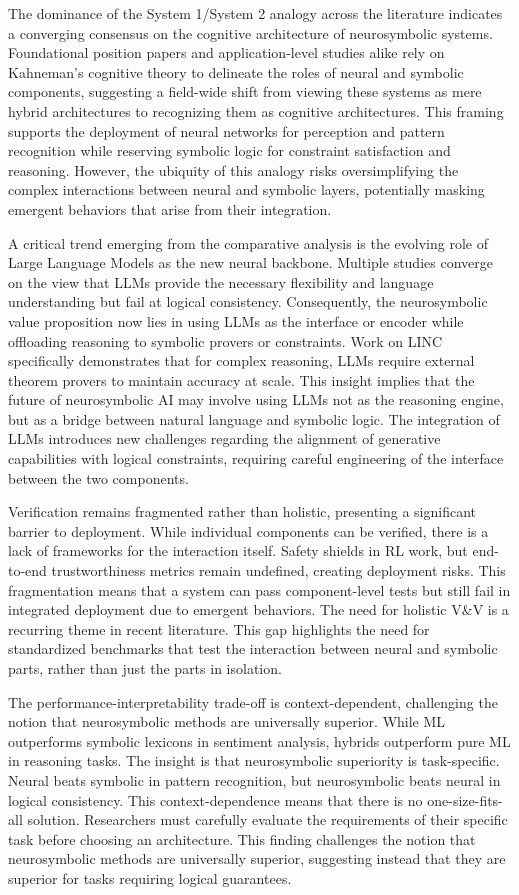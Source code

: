 \documentclass{article}
\begin{document}
The dominance of the System 1/System 2 analogy across the literature indicates a converging consensus on the cognitive architecture of neurosymbolic systems. Foundational position papers and application-level studies alike rely on Kahneman's cognitive theory to delineate the roles of neural and symbolic components, suggesting a field-wide shift from viewing these systems as mere hybrid architectures to recognizing them as cognitive architectures. This framing supports the deployment of neural networks for perception and pattern recognition while reserving symbolic logic for constraint satisfaction and reasoning. However, the ubiquity of this analogy risks oversimplifying the complex interactions between neural and symbolic layers, potentially masking emergent behaviors that arise from their integration.

A critical trend emerging from the comparative analysis is the evolving role of Large Language Models as the new neural backbone. Multiple studies converge on the view that LLMs provide the necessary flexibility and language understanding but fail at logical consistency. Consequently, the neurosymbolic value proposition now lies in using LLMs as the interface or encoder while offloading reasoning to symbolic provers or constraints. Work on LINC specifically demonstrates that for complex reasoning, LLMs require external theorem provers to maintain accuracy at scale. This insight implies that the future of neurosymbolic AI may involve using LLMs not as the reasoning engine, but as a bridge between natural language and symbolic logic. The integration of LLMs introduces new challenges regarding the alignment of generative capabilities with logical constraints, requiring careful engineering of the interface between the two components.

Verification remains fragmented rather than holistic, presenting a significant barrier to deployment. While individual components can be verified, there is a lack of frameworks for the interaction itself. Safety shields in RL work, but end-to-end trustworthiness metrics remain undefined, creating deployment risks. This fragmentation means that a system can pass component-level tests but still fail in integrated deployment due to emergent behaviors. The need for holistic V\&V is a recurring theme in recent literature. This gap highlights the need for standardized benchmarks that test the interaction between neural and symbolic parts, rather than just the parts in isolation.

The performance-interpretability trade-off is context-dependent, challenging the notion that neurosymbolic methods are universally superior. While ML outperforms symbolic lexicons in sentiment analysis, hybrids outperform pure ML in reasoning tasks. The insight is that neurosymbolic superiority is task-specific. Neural beats symbolic in pattern recognition, but neurosymbolic beats neural in logical consistency. This context-dependence means that there is no one-size-fits-all solution. Researchers must carefully evaluate the requirements of their specific task before choosing an architecture. This finding challenges the notion that neurosymbolic methods are universally superior, suggesting instead that they are superior for tasks requiring logical guarantees.
\end{document}
